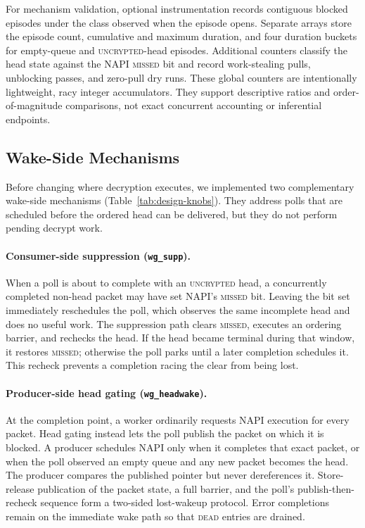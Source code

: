 For mechanism validation, optional instrumentation records contiguous blocked
episodes under the class observed when the episode opens.  Separate arrays
store the episode count, cumulative and maximum duration, and four duration
buckets for empty-queue and \textsc{uncrypted}-head episodes.  Additional
counters classify the head state against the NAPI \textsc{missed} bit and
record work-stealing pulls, unblocking passes, and zero-pull dry runs.  These
global counters are intentionally lightweight, racy integer accumulators.
They support descriptive ratios and order-of-magnitude comparisons, not exact
concurrent accounting or inferential endpoints.

\subsection{Wake-Side Mechanisms}
\label{sec:design-wake}

Before changing where decryption executes, we implemented two complementary
wake-side mechanisms (Table~\ref{tab:design-knobs}).  They address polls that
are scheduled before the ordered head can be delivered, but they do not
perform pending decrypt work.

\paragraph{Consumer-side suppression (\texttt{wg\_supp}).}
When a poll is about to complete with an \textsc{uncrypted} head, a concurrently
completed non-head packet may have set NAPI's \textsc{missed} bit.  Leaving the
bit set immediately reschedules the poll, which observes the same incomplete
head and does no useful work.  The suppression path clears \textsc{missed},
executes an ordering barrier, and rechecks the head.  If the head became
terminal during that window, it restores \textsc{missed}; otherwise the poll
parks until a later completion schedules it.  This recheck prevents a
completion racing the clear from being lost.

\paragraph{Producer-side head gating (\texttt{wg\_headwake}).}
At the completion point, a worker ordinarily requests NAPI execution for every
packet.  Head gating instead lets the poll publish the packet on which it is
blocked.  A producer schedules NAPI only when it completes that exact packet,
or when the poll observed an empty queue and any new packet becomes the head.
The producer compares the published pointer but never dereferences it.
Store-release publication of the packet state, a full barrier, and the poll's
publish-then-recheck sequence form a two-sided lost-wakeup protocol.  Error
completions remain on the immediate wake path so that \textsc{dead} entries are
drained.

